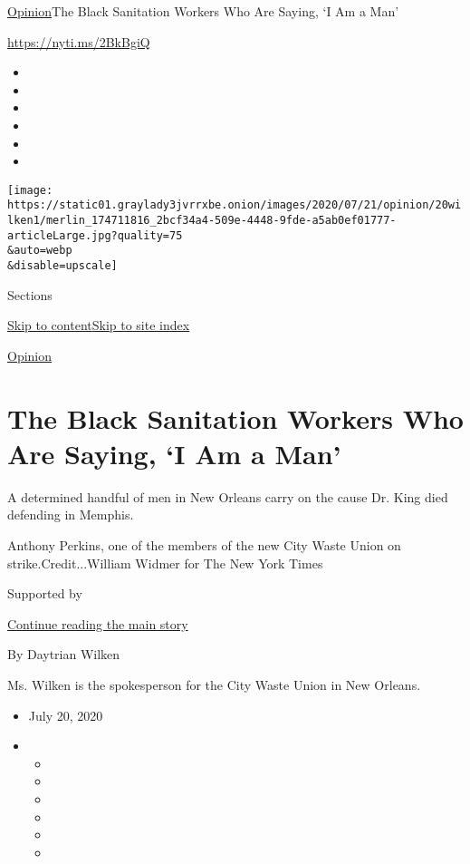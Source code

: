 \href{/section/opinion}{Opinion}\textbar{}The Black Sanitation Workers
Who Are Saying, `I Am a Man'

\url{https://nyti.ms/2BkBgiQ}

\begin{itemize}
\item
\item
\item
\item
\item
\item
\end{itemize}

\texttt{[image: https://static01.graylady3jvrrxbe.onion/images/2020/07/21/opinion/20wilken1/merlin\_174711816\_2bcf34a4-509e-4448-9fde-a5ab0ef01777-articleLarge.jpg?quality=75\\\&auto=webp\\\&disable=upscale]}

Sections

\protect\hyperlink{site-content}{Skip to
content}\protect\hyperlink{site-index}{Skip to site index}

\href{/section/opinion}{Opinion}

\hypertarget{the-black-sanitation-workers-who-are-saying-i-am-a-man}{%
\section{The Black Sanitation Workers Who Are Saying, `I Am a
Man'}\label{the-black-sanitation-workers-who-are-saying-i-am-a-man}}

A determined handful of men in New Orleans carry on the cause Dr. King
died defending in Memphis.

Anthony Perkins, one of the members of the new City Waste Union on
strike.Credit...William Widmer for The New York Times

Supported by

\protect\hyperlink{after-sponsor}{Continue reading the main story}

By Daytrian Wilken

Ms. Wilken is the spokesperson for the City Waste Union in New Orleans.

\begin{itemize}
\item
  July 20, 2020
\item
  \begin{itemize}
  \item
  \item
  \item
  \item
  \item
  \item
  \end{itemize}
\end{itemize}

